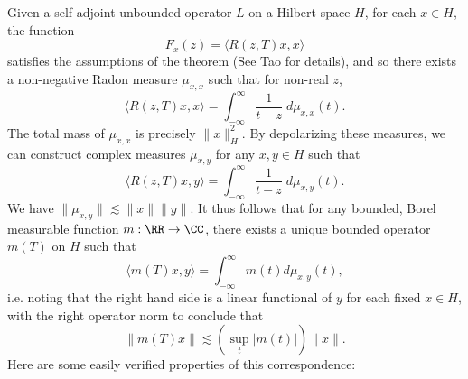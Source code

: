 Given a self-adjoint unbounded operator $L$ on a Hilbert space $H$, for each $x \in H$, the function
%
\[ F_x(z) = \langle R(z,T) x, x \rangle \]
%
satisfies the assumptions of the theorem (See Tao for details), and so there exists a non-negative Radon measure $\mu_{x,x}$ such that for non-real $z$,
%
\[ \langle R(z,T) x, x \rangle = \int_{-\infty}^\infty \frac{1}{t - z}\; d\mu_{x,x}(t). \]
%
The total mass of $\mu_{x,x}$ is precisely $\| x \|_H^2$. By depolarizing these measures, we can construct complex measures $\mu_{x,y}$ for any $x,y \in H$ such that
%
\[ \langle R(z,T) x, y \rangle = \int_{-\infty}^\infty \frac{1}{t - z}\; d\mu_{x,y}(t). \]
%
We have $\| \mu_{x,y} \| \lesssim \| x \| \| y \|$. It thus follows that for any bounded, Borel measurable function $m: \RR \to \CC$, there exists a unique bounded operator $m(T)$ on $H$ such that
%
\[ \langle m(T) x, y \rangle = \int_{-\infty}^\infty m(t) d\mu_{x,y}(t), \]
%
i.e. noting that the right hand side is a linear functional of $y$ for each fixed $x \in H$, with the right operator norm to conclude that
%
\[ \| m(T) x \| \lesssim \left( \sup_t |m(t)| \right) \| x \|. \]
%
Here are some easily verified properties of this correspondence:
%
